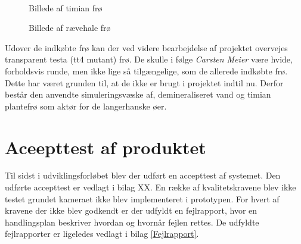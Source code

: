 \begin{figure}[htbp]
\begin{minipage}[b]{0.48\textwidth}
\end{minipage} \\ %
\begin{minipage}[b]{0.48\textwidth}
\caption{Billede af timian frø} %
\label{fig:timian}
\end{minipage} \hfill
\begin{minipage}[b]{0.48\textwidth}
\caption{Billede af rævehale frø} %
\label{fig:foxtail}
\end{minipage}
\end{figure}

Udover de indkøbte frø kan der ved videre bearbejdelse af projektet overvejes transparent testa (tt4 mutant) frø. De skulle i følge \textit{Carsten Meier} være hvide, forholdsvis runde, men ikke lige så tilgængelige, som de allerede indkøbte frø. Dette har været grunden til, at de ikke er brugt i projektet indtil nu. Derfor består den anvendte simuleringsvæske af, demineraliseret vand og timian plantefrø som aktør for de langerhanske øer.  
 
\section{Aceepttest af produktet} 
Til sidst i udviklingsforløbet blev der udført en accepttest af systemet. Den udførte accepttest er vedlagt i bilag XX. En række af kvalitetskravene blev ikke testet grundet kameraet ikke blev implementeret i prototypen. For hvert af kravene der ikke blev godkendt er der udfyldt en fejlrapport, hvor en handlingsplan beskriver hvordan og hvornår fejlen rettes. De udfyldte fejlrapporter er ligeledes vedlagt i bilag \ref{Fejlrapport}.

